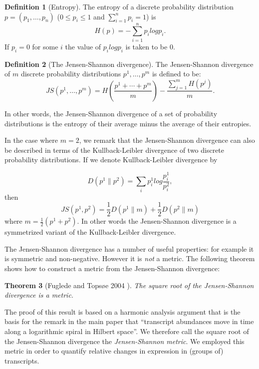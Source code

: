 \documentclass[12pt]{amsart}
\newtheorem{thm}{Theorem}
\theoremstyle{definition}
\newtheorem{defn}[thm]{Definition}
\begin{document}
\begin{defn}[Entropy]
The entropy of a discrete probability distribution
$p=(p_1,\ldots,p_n)$ ($0 \leq p_i \leq 1$ and $\sum_{i=1}^n p_i = 1$) is 
\begin{equation}
H(p) = -\sum_{i=1}^n p_i log p_i.
\end{equation}
If $p_i=0$ for some $i$ the value of $p_i log p_i$ is taken to be $0$.
\end{defn}
\begin{defn}[The Jensen-Shannon divergence]
The Jensen-Shannon divergence of $m$ discrete probability distributions $p^1,\ldots,p^m$ is defined to be:
\begin{equation}
JS(p^1,\ldots,p^m) = H\left(\frac{p^1 + \cdots + p^m}{m}\right) - \frac{\sum_{j=1}^m H(p^j)}{m}.
\end{equation}

In other words, the Jensen-Shannon divergence of a set of probability
distributions is the entropy of their average minus the average of their
entropies. \end{defn}

In the case where $m=2$, we remark that the Jensen-Shannon divergence can also
be described in terms of the Kullback-Leibler divergence of two discrete
probability distributions. If we denote Kullback-Leibler divergence by

\begin{equation}
D(p^1\|p^2) = \sum_i p^1_i log \frac{p^1_i}{p^2_i},
\end{equation}
then
\begin{equation}
JS(p^1,p^2) = \frac{1}{2}D(p^1\|m)+\frac{1}{2}D(p^2\|m)
\end{equation}
where $m=\frac{1}{2}(p^1+p^2)$. In other words the Jensen-Shannon
divergence is a symmetrized variant of the Kullback-Leibler divergence.

The Jensen-Shannon divergence has a number of useful properties: for
example it is symmetric and non-negative. However it is {\em not} a
metric. The following theorem shows how to construct a metric
from the Jensen-Shannon divergence:

\begin{thm}[Fuglede and Tops{\o}e 2004 \cite{Fuglede2004}]
The square root of the Jensen-Shannon divergence is a metric.
\end{thm}

The proof of this result is based on a harmonic analysis argument that is the basis for
the remark in the main paper that ``transcript abundances move in time along a
logarithmic spiral in Hilbert space''.  We therefore call the square root of the Jensen-Shannon divergence the {\em Jensen-Shannon metric}. We employed this metric in
order to quantify relative changes in expression in (groups of) transcripts.
\end{document}

